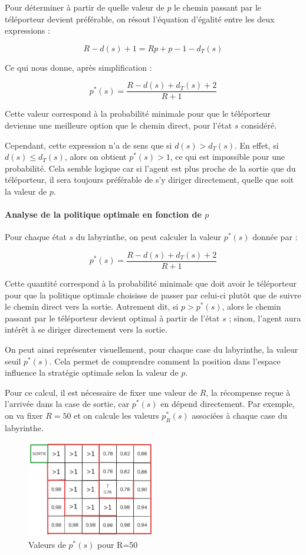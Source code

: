 \documentclass[12pt]{article}
\begin{document}
Pour déterminer à partir de quelle valeur de \(p\) le chemin passant par le téléporteur devient préférable, on résout l’équation d’égalité entre les deux expressions :

\[
R - d(s) + 1 = Rp + p - 1 - d_T(s)
\]

Ce qui nous donne, après simplification :

\[
p^*(s) = \frac{R - d(s) + d_T(s) + 2}{R + 1}
\]

Cette valeur correspond à la probabilité minimale pour que le téléporteur devienne une meilleure option que le chemin direct, pour l’état \(s\) considéré.

Cependant, cette expression n’a de sens que si \(d(s) > d_T(s)\). En effet, si \(d(s) \leq d_T(s)\), alors on obtient \(p^*(s) > 1\), ce qui est impossible pour une probabilité. Cela semble logique car si l’agent est plus proche de la sortie que du téléporteur, il sera toujours préférable de s’y diriger directement, quelle que soit la valeur de \(p\).

\paragraph{Analyse de la politique optimale en fonction de \(p\)}

Pour chaque état \(s\) du labyrinthe, on peut calculer la valeur \(p^*(s)\) donnée par :

\[
p^*(s) = \frac{R - d(s) + d_T(s) + 2}{R + 1}
\]

Cette quantité correspond à la probabilité minimale que doit avoir le téléporteur pour que la politique optimale choisisse de passer par celui-ci plutôt que de suivre le chemin direct vers la sortie. Autrement dit, si \(p > p^*(s)\), alors le chemin passant par le téléporteur devient optimal à partir de l’état \(s\) ; sinon, l’agent aura intérêt à se diriger directement vers la sortie.

On peut ainsi représenter visuellement, pour chaque case du labyrinthe, la valeur seuil \(p^*(s)\). Cela permet de comprendre comment la position dans l’espace influence la stratégie optimale selon la valeur de \(p\). 

Pour ce calcul, il est nécessaire de fixer une valeur de \(R\), la récompense reçue à l’arrivée dans la case de sortie, car \(p^*(s)\) en dépend directement. Par exemple, on va fixer \(R = 50\) et on calcule les valeurs \(p^*_R(s)\) associées à chaque case du labyrinthe.



\begin{figure}[H]
    \centering
    \includegraphics[width=0.5\textwidth]{labyrinthep.png}
    \caption{Valeurs de \(p^*(s)\) pour R=50}
\end{figure}
\end{document}
